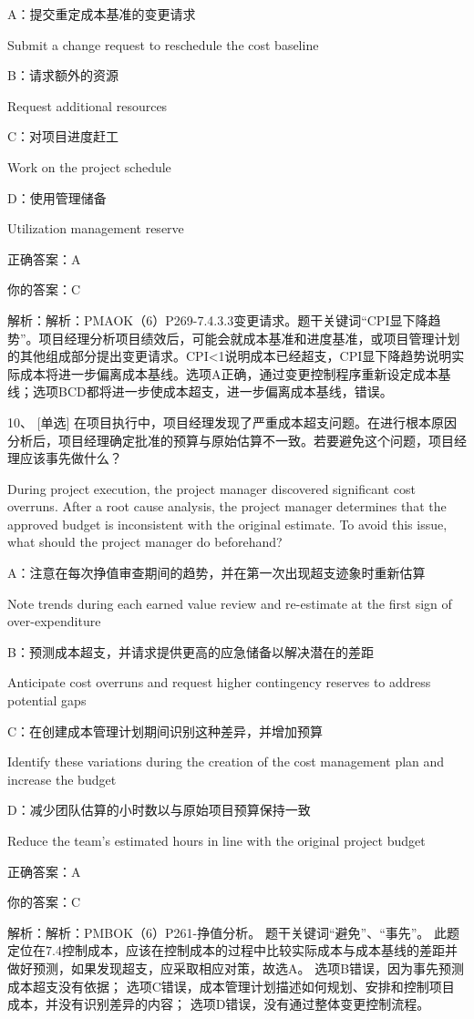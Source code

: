 A：提交重定成本基准的变更请求

Submit a change request to reschedule the cost baseline

B：请求额外的资源

Request additional resources

C：对项目进度赶工

Work on the project schedule

D：使用管理储备

Utilization management reserve

正确答案：A

你的答案：C

解析：解析：PMAOK（6）P269-7.4.3.3变更请求。题干关键词“CPI显下降趋势”。项目经理分析项目绩效后，可能会就成本基准和进度基准，或项目管理计划的其他组成部分提出变更请求。CPI<1说明成本已经超支，CPI显下降趋势说明实际成本将进一步偏离成本基线。选项A正确，通过变更控制程序重新设定成本基线；选项BCD都将进一步使成本超支，进一步偏离成本基线，错误。


10、 [单选] 在项目执行中，项目经理发现了严重成本超支问题。在进行根本原因分析后，项目经理确定批准的预算与原始估算不一致。若要避免这个问题，项目经理应该事先做什么？

During project execution, the project manager discovered significant cost overruns. After a root cause analysis, the project manager determines that the approved budget is inconsistent with the original estimate. To avoid this issue, what should the project manager do beforehand?

A：注意在每次挣值审查期间的趋势，并在第一次出现超支迹象时重新估算

Note trends during each earned value review and re-estimate at the first sign of over-expenditure

B：预测成本超支，并请求提供更高的应急储备以解决潜在的差距

Anticipate cost overruns and request higher contingency reserves to address potential gaps

C：在创建成本管理计划期间识别这种差异，并增加预算

Identify these variations during the creation of the cost management plan and increase the budget

D：减少团队估算的小时数以与原始项目预算保持一致

Reduce the team's estimated hours in line with the original project budget

正确答案：A

你的答案：C

解析：解析：PMBOK（6）P261-挣值分析。 题干关键词“避免”、“事先”。 此题定位在7.4控制成本，应该在控制成本的过程中比较实际成本与成本基线的差距并做好预测，如果发现超支，应采取相应对策，故选A。 选项B错误，因为事先预测成本超支没有依据； 选项C错误，成本管理计划描述如何规划、安排和控制项目成本，并没有识别差异的内容； 选项D错误，没有通过整体变更控制流程。


